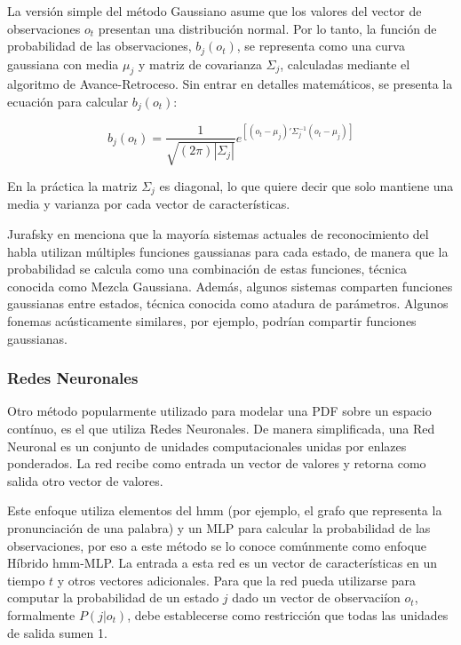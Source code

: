 La versi\'{o}n simple del m\'etodo Gaussiano asume que los valores del vector de observaciones $o_t$ presentan una distribuci\'on
normal. Por lo tanto, la funci\'on de probabilidad de las observaciones, $b_j(o_t)$, se representa como una curva gaussiana con
media $\mu_j$ y matriz de covarianza $\Sigma_j$, calculadas mediante el algoritmo de Avance-Retroceso. Sin entrar en detalles 
matem\'aticos, se presenta la ecuaci\'on para calcular $b_j(o_t)$:

\begin{equation}
    b_j(o_t) = \frac{1}{\sqrt{(2\pi)|\Sigma_j|}}e^{[(o_t-\mu_j)'\Sigma_j^{-1}(o_t-\mu_j)]}
\end{equation}

En la pr\'actica la matriz $\Sigma_j$ es diagonal, lo que quiere decir que solo mantiene una media y varianza por cada vector
de caracter\'isticas.

Jurafsky en \cite{Jurafsky} menciona que la mayor\'ia sistemas actuales de reconocimiento del habla utilizan m\'ultiples funciones gaussianas 
para cada estado, de manera que la probabilidad se calcula como una combinaci\'on de estas funciones, t\'ecnica conocida como
Mezcla Gaussiana. Adem\'as, algunos sistemas comparten funciones gaussianas entre estados, t\'ecnica conocida como atadura de
par\'ametros. Algunos fonemas ac\'usticamente similares, por ejemplo, podr\'ian compartir funciones gaussianas.

\subsubsection{Redes Neuronales}
\label{sec:likelihoodNeuralNet}

Otro m\'etodo popularmente utilizado para modelar una PDF sobre un espacio cont\'inuo, es el que utiliza Redes Neuronales. 
De manera simplificada, una Red Neuronal es un conjunto de unidades computacionales unidas por enlazes ponderados. La red recibe
como entrada un vector de valores y retorna como salida otro vector de valores.

Este enfoque utiliza elementos del \gls{hmm} (por ejemplo, el grafo que representa la pronunciaci\'on de una palabra) y un \gls{MLP} para calcular la probabilidad de las observaciones, por eso a este m\'etodo se lo
conoce com\'unmente como enfoque H\'ibrido \gls{hmm}-\gls{MLP}. La entrada a esta red es un vector de caracter\'isticas en un tiempo $t$ y
otros vectores adicionales. Para que la red pueda utilizarse para computar la probabilidad de un estado $j$ dado un vector
de observaci\'ion $o_t$, formalmente $P(j|o_t)$, debe establecerse como restricci\'on que todas las unidades de salida sumen 1.

